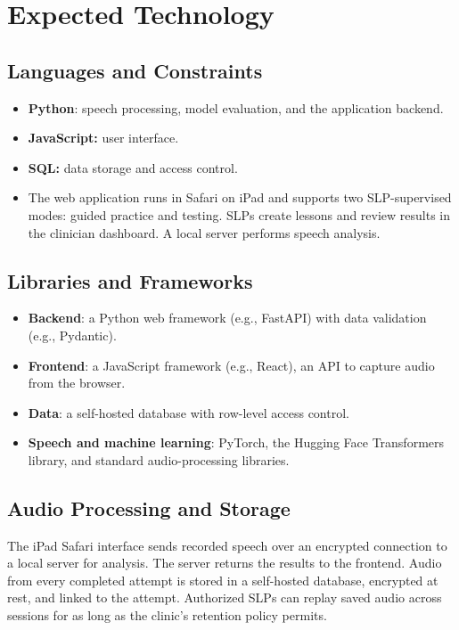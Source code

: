 \documentclass{article}
\begin{document}
\section{Expected Technology}

\subsection{Languages and Constraints}

\begin{itemize}
\item \textbf{Python}: speech processing, model evaluation, and the application backend.
\item \textbf{JavaScript:} user interface.
\item \textbf{SQL:} data storage and access control.
\item The web application runs in Safari on iPad and supports two
  SLP-supervised modes: guided practice and testing. SLPs create lessons
  and review results in the clinician dashboard. A local server performs
  speech analysis.
\end{itemize}

\subsection{Libraries and Frameworks}

\begin{itemize}
\item \textbf{Backend}: a Python web framework (e.g., FastAPI)
  with data validation (e.g., Pydantic).
\item \textbf{Frontend}: a JavaScript framework (e.g., React), an API to capture audio from the browser.
\item \textbf{Data}: a self-hosted database with row-level access control.
\item \textbf{Speech and machine learning}: PyTorch, the Hugging Face
  Transformers library, and standard audio-processing libraries.
\end{itemize}

\subsection{Audio Processing and Storage}

The iPad Safari interface sends recorded speech over an encrypted connection
to a local server for analysis. The server returns the results to the
frontend. Audio from every completed attempt is stored in a self-hosted
database, encrypted at rest, and linked to the attempt. Authorized SLPs can
replay saved audio across sessions for as long as the clinic's retention
policy permits.
\end{document}
